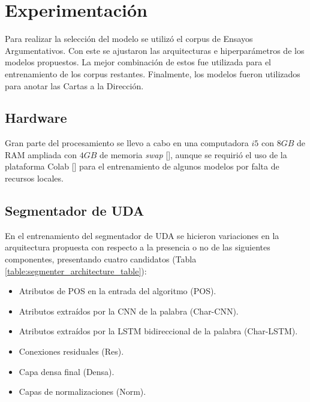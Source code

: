 \section{Experimentación}

Para realizar la selección del modelo se utilizó el corpus de Ensayos Argumentativos. Con este se ajustaron
las arquitecturas e hiperparámetros de los modelos propuestos. La mejor combinación de estos fue utilizada 
para el entrenamiento de los corpus restantes. Finalmente, los modelos fueron utilizados para anotar las Cartas 
a la Dirección. 

\subsection{Hardware}

Gran parte del procesamiento se llevo a cabo en una computadora $i5$ con $8GB$ de RAM ampliada con $4GB$ de memoria 
\emph{swap} [\cite{swap}], aunque se requirió el uso de la plataforma Colab [\cite{colab}] para 
el entrenamiento de algunos modelos por falta de recursos locales.

\subsection{Segmentador de UDA}

En el entrenamiento del segmentador de UDA se hicieron variaciones en la arquitectura propuesta con respecto a la
presencia o no de las siguientes componentes, presentando cuatro candidatos (Tabla \ref{table:segmenter_architecture_table}):

\begin{itemize}
    \item Atributos de POS en la entrada del algoritmo (POS).
    \item Atributos extraídos por la CNN de la palabra (Char-CNN).
    \item Atributos extraídos por la LSTM bidireccional de la palabra (Char-LSTM).
    \item Conexiones residuales (Res).
    \item Capa densa final (Densa).
    \item Capas de normalizaciones (Norm).
\end{itemize}

